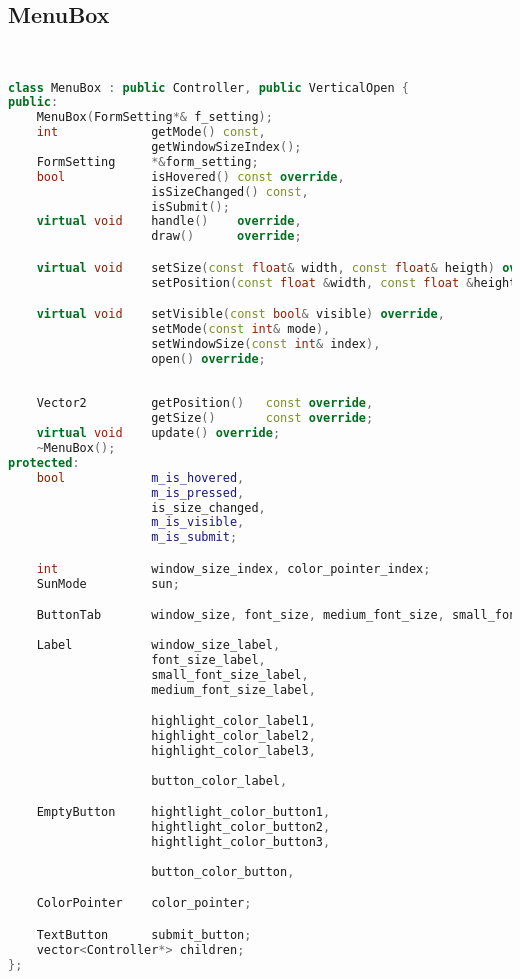 \subsection{MenuBox}
\begin{lstlisting}[language=C++]


class MenuBox : public Controller, public VerticalOpen {
public:
    MenuBox(FormSetting*& f_setting);
    int             getMode() const,
                    getWindowSizeIndex();
    FormSetting     *&form_setting;
    bool            isHovered() const override,
                    isSizeChanged() const,
                    isSubmit();
    virtual void    handle()    override,
                    draw()      override;

    virtual void    setSize(const float& width, const float& heigth) override,
                    setPosition(const float &width, const float &height) override;

    virtual void    setVisible(const bool& visible) override,
                    setMode(const int& mode),
                    setWindowSize(const int& index),
                    open() override;
    
                
    Vector2         getPosition()   const override,
                    getSize()       const override;
    virtual void    update() override;
    ~MenuBox();
protected:
    bool            m_is_hovered,
                    m_is_pressed,
                    is_size_changed,
                    m_is_visible,
                    m_is_submit;

    int             window_size_index, color_pointer_index;
    SunMode         sun;

    ButtonTab       window_size, font_size, medium_font_size, small_font_size;
    
    Label           window_size_label, 
                    font_size_label, 
                    small_font_size_label, 
                    medium_font_size_label,

                    highlight_color_label1,
                    highlight_color_label2,
                    highlight_color_label3,
                    
                    button_color_label,

    EmptyButton     hightlight_color_button1,
                    hightlight_color_button2,
                    hightlight_color_button3,
                    
                    button_color_button,

    ColorPointer    color_pointer;

    TextButton      submit_button;
    vector<Controller*> children;
};






\end{lstlisting}
